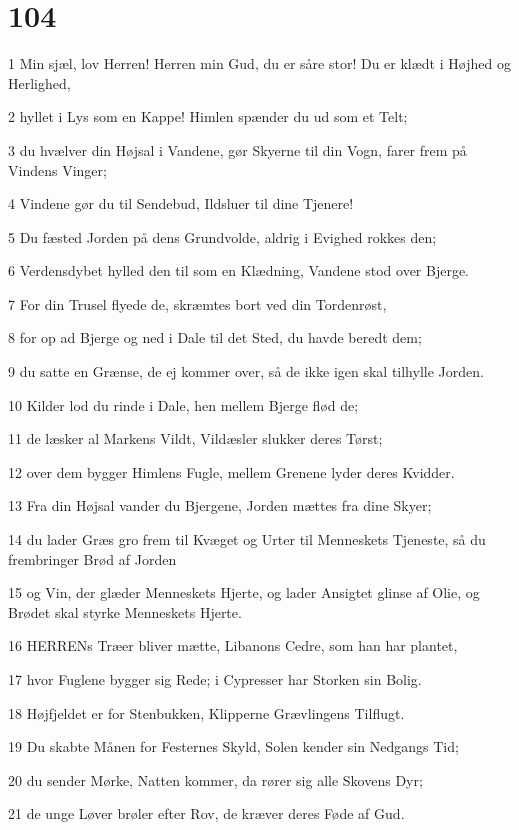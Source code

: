 \chapter{104}

\par 1 Min sjæl, lov Herren! Herren min Gud, du er såre stor! Du er klædt i Højhed og Herlighed,
\par 2 hyllet i Lys som en Kappe! Himlen spænder du ud som et Telt;
\par 3 du hvælver din Højsal i Vandene, gør Skyerne til din Vogn, farer frem på Vindens Vinger;
\par 4 Vindene gør du til Sendebud, Ildsluer til dine Tjenere!
\par 5 Du fæsted Jorden på dens Grundvolde, aldrig i Evighed rokkes den;
\par 6 Verdensdybet hylled den til som en Klædning, Vandene stod over Bjerge.
\par 7 For din Trusel flyede de, skræmtes bort ved din Tordenrøst,
\par 8 for op ad Bjerge og ned i Dale til det Sted, du havde beredt dem;
\par 9 du satte en Grænse, de ej kommer over, så de ikke igen skal tilhylle Jorden.
\par 10 Kilder lod du rinde i Dale, hen mellem Bjerge flød de;
\par 11 de læsker al Markens Vildt, Vildæsler slukker deres Tørst;
\par 12 over dem bygger Himlens Fugle, mellem Grenene lyder deres Kvidder.
\par 13 Fra din Højsal vander du Bjergene, Jorden mættes fra dine Skyer;
\par 14 du lader Græs gro frem til Kvæget og Urter til Menneskets Tjeneste, så du frembringer Brød af Jorden
\par 15 og Vin, der glæder Menneskets Hjerte, og lader Ansigtet glinse af Olie, og Brødet skal styrke Menneskets Hjerte.
\par 16 HERRENs Træer bliver mætte, Libanons Cedre, som han har plantet,
\par 17 hvor Fuglene bygger sig Rede; i Cypresser har Storken sin Bolig.
\par 18 Højfjeldet er for Stenbukken, Klipperne Grævlingens Tilflugt.
\par 19 Du skabte Månen for Festernes Skyld, Solen kender sin Nedgangs Tid;
\par 20 du sender Mørke, Natten kommer, da rører sig alle Skovens Dyr;
\par 21 de unge Løver brøler efter Rov, de kræver deres Føde af Gud.
